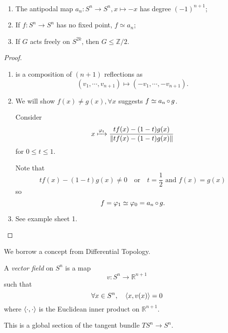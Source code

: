 \documentclass[a4paper,11pt]{article}
\begin{document}
	\begin{cor}
		\
		\begin{enumerate}
			\item The antipodal map $a_n : S^n \to S^n, x \mapsto -x$ has degree $(-1)^{n+1}$;
			\item If $f: S^n \to S^n$ has no fixed point, $f \simeq a_n$;
			\item If $G$ acts freely on $S ^{2k}$, then $G \leq \mathbb{Z}/2$.
		\end{enumerate}
	\end{cor}
	\begin{proof}
		\ 
		\begin{enumerate}
			\item {} is a composition of $(n+1)$ reflections as
			\[
				(v_1, \cdots, v _{n+1}) \mapsto (-v_1,\cdots, - v _{n+1}).
			\]
			\item We will show $f(x)\neq g(x), \forall x$ suggests $f \simeq a_n \operatorname{\circ} g$.
			
			Consider 
			\[
				x \xmapsto{\varphi_t} \frac{t f(x) - (1-t) g(x)}{\norm{t f(x) - (1-t) g(x)}}
			\]
			for $0 \leq t \leq 1$.

			Note that 
			\[
				t f(x) - (1-t)g(x) \neq 0 \quad \text{or} \quad t = \frac{1}{2} \text{ and } f(x) = g(x)
			\]
			so
			\[
				f = \varphi_1 \simeq \varphi_0 = a_n \operatorname{\circ} g.
			\]
			\item See example sheet 1.
		\end{enumerate}
	\end{proof}

	We borrow a concept from Differential Topology.
	\begin{defi}
		A \emph{vector field} on $S^n$ is a map
		\[
			v: S^n \to \mathbb{R}^{n+1}
		\]
		such that
		\[
			\forall x \in S^n, \quad \expval{x, v(x)} = 0
		\]
		where $\expval{\cdot,\cdot}$ is the Euclidean inner product on $\mathbb{R}^{n+1}$.
	\end{defi}

	\begin{nt}
		This is a global section of the tangent bundle $TS^n \to S^n$.
	\end{nt}
\end{document}
